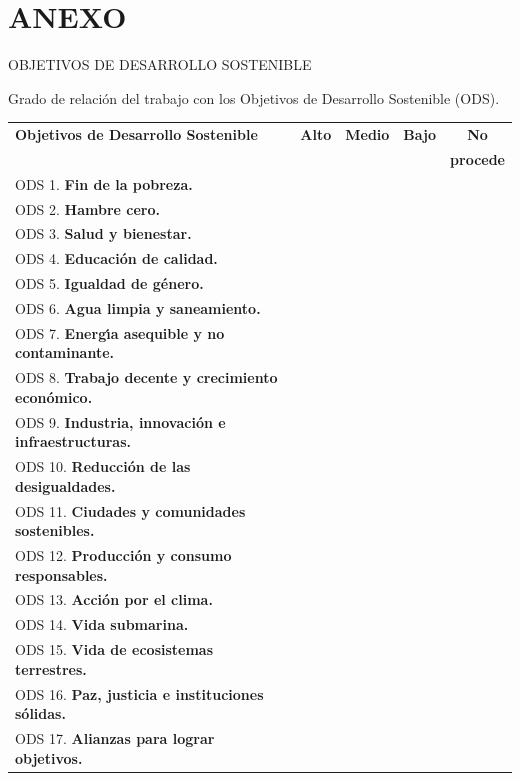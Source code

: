 \documentclass[11pt]{article}
\begin{document}
\phantom{x}

\vspace{1ex}

\section*{ANEXO}

\vspace{2ex}

OBJETIVOS DE DESARROLLO SOSTENIBLE

\vspace{4ex}

Grado de relaci\'on del trabajo con los Objetivos de Desarrollo Sostenible (ODS).

\vspace{2ex}

\begin{tabular}{|l|c|c|c|c|}\hline
\textbf{Objetivos de Desarrollo Sostenible} & \textbf{Alto} & \textbf{Medio} & \textbf{Bajo} & \textbf{No} \\
& & & & \textbf{procede} \\ \hline
ODS 1.  \textbf{Fin de la pobreza.}                            & & & & \\ \hline
ODS 2.  \textbf{Hambre cero.}                                  & & & & \\ \hline
ODS 3.  \textbf{Salud y bienestar.}                            & & & & \\ \hline
ODS 4.  \textbf{Educaci\'on de calidad.}                       & & & & \\ \hline
ODS 5.  \textbf{Igualdad de g\'enero.}                         & & & & \\ \hline
ODS 6.  \textbf{Agua limpia y saneamiento.}                    & & & & \\ \hline
ODS 7.  \textbf{Energ\'{\i}a asequible y no contaminante.}     & & & & \\ \hline
ODS 8.  \textbf{Trabajo decente y crecimiento econ\'omico.}    & & & & \\ \hline
ODS 9.  \textbf{Industria, innovaci\'on e infraestructuras.}   & & & & \\ \hline
ODS 10. \textbf{Reducci\'on de las desigualdades.}             & & & & \\ \hline
ODS 11. \textbf{Ciudades y comunidades sostenibles.}           & & & & \\ \hline
ODS 12. \textbf{Producci\'on y consumo responsables.}          & & & & \\ \hline
ODS 13. \textbf{Acci\'on por el clima.}                        & & & & \\ \hline
ODS 14. \textbf{Vida submarina.}                               & & & & \\ \hline
ODS 15. \textbf{Vida de ecosistemas terrestres.}               & & & & \\ \hline
ODS 16. \textbf{Paz, justicia e instituciones s\'olidas.}      & & & & \\ \hline
ODS 17. \textbf{Alianzas para lograr objetivos.}               & & & & \\ \hline
\end{tabular}
\end{document}
